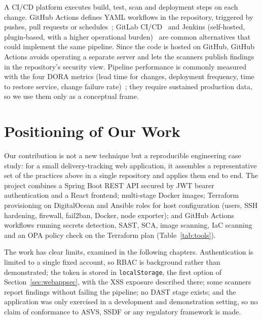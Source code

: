 A CI/CD platform executes build, test, scan and deployment steps on each change. GitHub Actions defines YAML workflows in the repository, triggered by pushes, pull requests or schedules~\cite{github-actions}; GitLab CI/CD~\cite{gitlab-ci} and Jenkins (self-hosted, plugin-based, with a higher operational burden)~\cite{jenkins} are common alternatives that could implement the same pipeline. Since the code is hosted on GitHub, GitHub Actions avoids operating a separate server and lets the scanners publish findings in the repository's security view. Pipeline performance is commonly measured with the four DORA metrics (lead time for changes, deployment frequency, time to restore service, change failure rate)~\cite{forsgren2018}; they require sustained production data, so we use them only as a conceptual frame.

\section{Positioning of Our Work}
\label{sec:positioning}

Our contribution is not a new technique but a reproducible engineering case study: for a small delivery-tracking web application, it assembles a representative set of the practices above in a single repository and applies them end to end. The project combines a Spring Boot REST API secured by JWT bearer authentication and a React frontend; multi-stage Docker images; Terraform provisioning on DigitalOcean and Ansible roles for host configuration (users, SSH hardening, firewall, fail2ban, Docker, node exporter); and GitHub Actions workflows running secrets detection, SAST, SCA, image scanning, IaC scanning and an OPA policy check on the Terraform plan (Table~\ref{tab:tools}).

The work has clear limits, examined in the following chapters. Authentication is limited to a single fixed account, so RBAC is background rather than demonstrated; the token is stored in \texttt{localStorage}, the first option of Section~\ref{sec:webappsec}, with the XSS exposure described there; some scanners report findings without failing the pipeline; no DAST stage exists; and the application was only exercised in a development and demonstration setting, so no claim of conformance to ASVS, SSDF or any regulatory framework is made.
